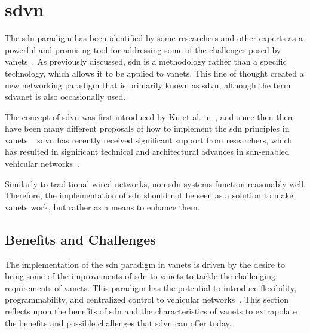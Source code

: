 
%

\chapter[Software Defined Vehicular Network]{\gls{sdvn}}
\label{cha:sdvn}

The \gls{sdn} paradigm has been identified by some researchers and other experts as a powerful and promising tool for addressing some of the challenges posed by \glspl{vanet}~\cite{smida_efficient_2020}. As previously discussed, \gls{sdn} is a methodology rather than a specific technology, which allows it to be applied to \glspl{vanet}. This line of thought created a new networking paradigm that is primarily known as \gls{sdvn}, although the term \gls{sdvanet} is also occasionally used.

The concept of \gls{sdvn} was first introduced by Ku et al. in~\cite{ku_towards_2014}, and since then there have been many different proposals of how to implement the \gls{sdn} principles in \glspl{vanet}~\cite{cardona_software-defined_2020}. \gls{sdvn} has recently received significant support from researchers, which has resulted in significant technical and architectural advances in \gls{sdn}-enabled vehicular networks~\cite{bhatia_software_2019}. 

Similarly to traditional wired networks, non-\gls{sdn} systems function reasonably well. Therefore, the implementation of \gls{sdn} should not be seen as a solution to make \glspl{vanet} work, but rather as a means to enhance them.

\section{Benefits and Challenges}

The implementation of the \gls{sdn} paradigm in \glspl{vanet} is driven by the desire to bring some of the improvements of \gls{sdn} to \glspl{vanet} to tackle the challenging requirements of \glspl{vanet}. This paradigm has the potential to introduce flexibility, programmability, and centralized control to vehicular networks~\cite{bhatia_software_2019}. This section reflects upon the benefits of \gls{sdn} and the characteristics of \glspl{vanet} to extrapolate the benefits and possible challenges that \gls{sdvn} can offer today.

